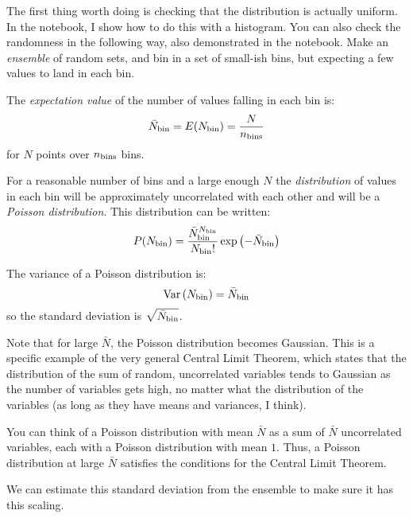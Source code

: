 The first thing worth doing is checking that the distribution is
actually uniform. In the notebook, I show how to do this with a
histogram. You can also check the randomness in the following way,
also demonstrated in the notebook. Make an {\it ensemble} of random
sets, and bin in a set of small-ish bins, but expecting a few values
to land in each bin.

The {\it expectation value} of the number of values falling in each
bin is:
\begin{equation}
{\bar N}_{\rm bin} = E(N_{\rm bin}) = \frac{N}{n_{\rm bins}}
\end{equation}
for $N$ points over $n_{\rm bins}$ bins. 

For a reasonable number of bins and a large enough $N$ the {\it
  distribution} of values in each bin will be approximately
uncorrelated with each other and will be a {\it Poisson
  distribution}. This distribution can be written:
\begin{equation}
P(N_{\rm bin}) = \frac{{\bar N}_{\rm bin}^{N_{\rm bin}}}{N_{\rm bin}!}
\exp\left(-  {\bar N}_{\rm bin}\right)
\end{equation}

The variance of a Poisson distribution is:
\begin{equation}
{\rm Var}\left(N_{\rm bin}\right) = {\bar N}_{\rm bin}
\end{equation}
so the standard deviation is $\sqrt{{\bar N}_{\rm bin}}$.

Note that for large $\bar N$, the Poisson distribution becomes
Gaussian.  This is a specific example of the very general Central
Limit Theorem, which states that the distribution of the sum of
random, uncorrelated variables tends to Gaussian as the number of
variables gets high, no matter what the distribution of the variables
(as long as they have means and variances, I think).


\begin{answer}
You can think of a Poisson distribution with mean $\bar N$ as a sum of
$\bar N$ uncorrelated variables, each with a Poisson distribution with
mean $1$.  Thus, a Poisson distribution at large $\bar N$ satisfies
the conditions for the Central Limit Theorem.
\end{answer}

We can estimate this standard deviation from the ensemble to make sure
it has this scaling. 

